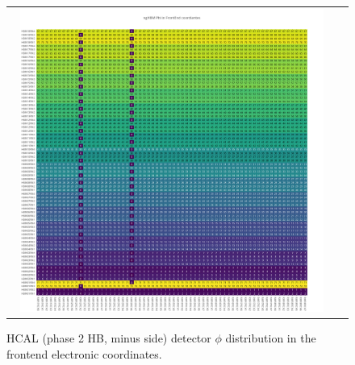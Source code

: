 \begin{figure}[htb]
 \begin{center}
  \begin{tabular}{cc}
   \includegraphics[angle=0,width=0.95\textwidth]{figures/appendix/ngHBM_Phi_in_FrontEnd.png}
  \end{tabular}
  \caption{HCAL (phase 2 HB, minus side) detector $\phi$ distribution in the frontend electronic coordinates.}
  \label{fig:lmapngHBMPhiFEC}
 \end{center}
\end{figure}
\clearpage

